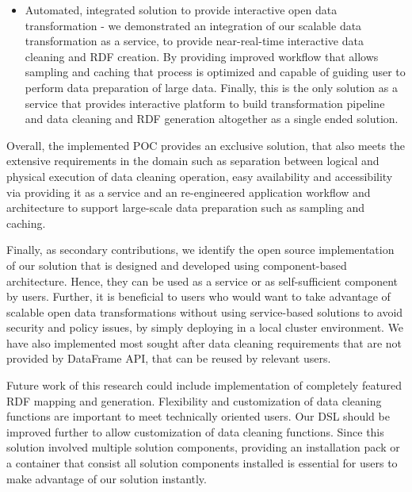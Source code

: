 \begin{itemize}
\item Automated, integrated solution to provide interactive open data transformation - we demonstrated an integration of our scalable data transformation as a service, to provide near-real-time interactive data cleaning and RDF creation. By providing improved workflow that allows sampling and caching that process is optimized and capable of guiding user to perform data preparation of large data. Finally, this is the only solution as a service that provides interactive platform to build transformation pipeline and data cleaning and RDF generation altogether as a single ended solution.
\end{itemize}
Overall, the implemented POC provides an exclusive solution, that also meets the extensive requirements in the domain such as separation between logical and physical execution of data cleaning operation, easy availability and accessibility via providing it as a service and an re-engineered application workflow and architecture to support large-scale data preparation such as sampling and caching. 
 
Finally, as secondary contributions, we identify the open source implementation of our solution that is designed and developed using component-based architecture. Hence, they can be used as a service or as self-sufficient component by users. Further, it is beneficial to users who would want to take advantage of scalable open data transformations without using service-based solutions to avoid security and policy issues, by simply deploying in a local cluster environment. We have also implemented most sought after data cleaning requirements that are not provided by DataFrame API, that can be reused by relevant users. 

Future work of this research could include implementation of completely featured RDF mapping and generation. Flexibility and customization of data cleaning functions are important to meet technically oriented users. Our DSL should be improved further to allow customization of data cleaning functions. Since this solution involved multiple solution components, providing an installation pack or a container that consist all solution components installed is essential for users to make advantage of our solution instantly.  


